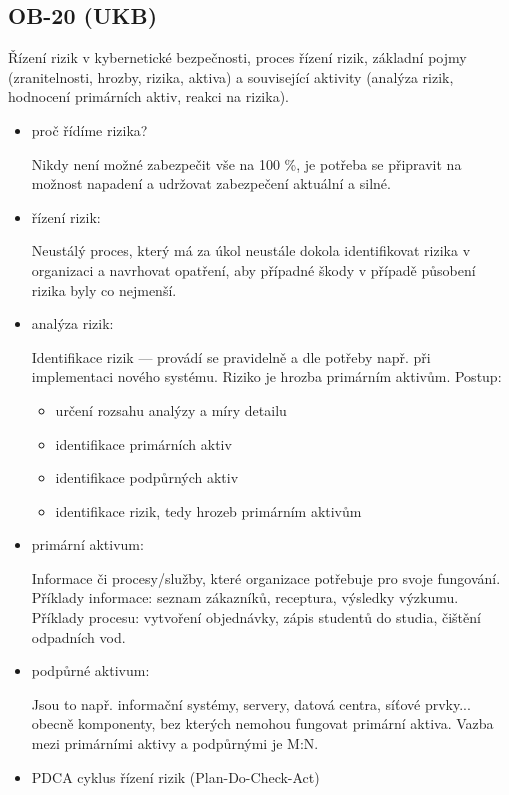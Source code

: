\subsection{OB-20 (UKB)}
Řízení rizik v kybernetické bezpečnosti, proces řízení rizik, základní pojmy (zranitelnosti, hrozby, rizika, aktiva) a související aktivity (analýza rizik, hodnocení primárních aktiv, reakci na rizika).

\begin{itemize}
	\item proč řídíme rizika?
	
		Nikdy není možné zabezpečit vše na 100 \%, je potřeba se připravit na možnost napadení a udržovat zabezpečení aktuální a silné.
		
	\item řízení rizik:
		
		Neustálý proces, který má za úkol neustále dokola identifikovat rizika v organizaci a navrhovat opatření, aby případné škody v případě působení rizika byly co nejmenší.
		
	\item analýza rizik:
	
		Identifikace rizik --- provádí se pravidelně a dle potřeby např. při implementaci nového systému. Riziko je hrozba primárním aktivům. Postup:
		\begin{itemize}
			\item určení rozsahu analýzy a míry detailu
			\item identifikace primárních aktiv
			\item identifikace podpůrných aktiv
			\item identifikace rizik, tedy hrozeb primárním aktivům
		\end{itemize}
		
	\item primární aktivum:
	
		Informace či procesy/služby, které organizace potřebuje pro svoje fungování. Příklady informace: seznam zákazníků, receptura, výsledky výzkumu. Příklady procesu: vytvoření objednávky, zápis studentů do studia, čištění odpadních vod.
		
	\item podpůrné aktivum:
	
		Jsou to např. informační systémy, servery, datová centra, síťové prvky... obecně komponenty, bez kterých nemohou fungovat primární aktiva. Vazba mezi primárními aktivy a podpůrnými je M:N.
		
	\item PDCA cyklus řízení rizik (Plan-Do-Check-Act)
	

\end{itemize}
